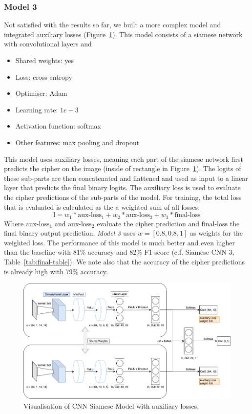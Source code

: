 \documentclass[10pt,conference,compsocconf]{IEEEtran}
\begin{document}
\subsubsection*{Model 3}
Not satisfied with the results so far, we built a more complex model and integrated auxiliary losses (Figure~\ref{fig:siamese5}). This model consists of a siamese network with convolutional layers and 
\begin{itemize}
    \item Shared weights: yes
    \item Loss: cross-entropy
    \item Optimiser: Adam
    \item Learning rate: $1e-3$
    \item Activation function: softmax
    \item Other features: max pooling and dropout
\end{itemize}
This model uses auxiliary losses, meaning each part of the siamese network first predicts the cipher on the image (inside of rectangle in Figure~\ref{fig:siamese5}). The logits of these sub-parts are then concatenated and flattened and used as input to a linear layer that predicts the final binary logits. The auxiliary loss is used to evaluate the cipher predictions of the sub-parts of the model. For training, the total loss that is evaluated is calculated as the a weighted sum of all losses: 
\begin{equation}\label{eq:weighted-loss}
    \text{l} = w_1*\text{aux-loss}_1+w_2*\text{aux-loss}_2+w_3*\text{final-loss}
\end{equation}
Where $\text{aux-loss}_1$ and $\text{aux-loss}_2$ evaluate the cipher prediction and $\text{final-loss}$ the final binary output prediction. \textit{Model 3} uses $w = [0.8, 0.8, 1]$ as weights for the weighted loss. The performance of this model is much better and even higher than the baseline with 81\% accuracy and 82\% F1-score (c.f. Siamese CNN 3, Table~\ref{tab:final-table}). We note also that the accuracy of the cipher predictions is already high with 79\% accuracy. 

\begin{figure}[htbp]
  \centering
  \includegraphics[width=\columnwidth]{doc/project1-report/cnnsiamese.png}
  \vspace{-3mm}
  \caption{Visualisation of CNN Siamese Model with auxiliary losses.}
  \label{fig:siamese5}
\end{figure}
\end{document}
